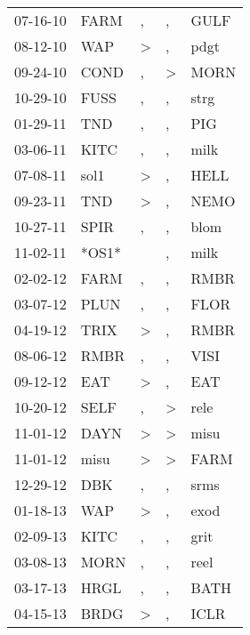 \begin{supertabular}{lllll}
 07-16-10 &   FARM &                , &                , &   GULF \\
 08-12-10 &    WAP &     \textgreater &                , &   pdgt \\
 09-24-10 &   COND &                , &     \textgreater &   MORN \\
 10-29-10 &   FUSS &                , &                , &   strg \\
 01-29-11 &    TND &                , &                , &    PIG \\
 03-06-11 &   KITC &                , &                , &   milk \\
 07-08-11 &   sol1 &     \textgreater &                , &   HELL \\
 09-23-11 &    TND &     \textgreater &                , &   NEMO \\
 10-27-11 &   SPIR &                , &                , &   blom \\
 11-02-11 &  *OS1* &                  &                , &   milk \\
 02-02-12 &   FARM &                , &                , &   RMBR \\
 03-07-12 &   PLUN &                , &                , &   FLOR \\
 04-19-12 &   TRIX &     \textgreater &                , &   RMBR \\
 08-06-12 &   RMBR &                , &                , &   VISI \\
 09-12-12 &    EAT &     \textgreater &                , &    EAT \\
 10-20-12 &   SELF &                , &     \textgreater &   rele \\
 11-01-12 &   DAYN &     \textgreater &     \textgreater &   misu \\
 11-01-12 &   misu &     \textgreater &     \textgreater &   FARM \\
 12-29-12 &    DBK &                , &                , &   srms \\
 01-18-13 &    WAP &     \textgreater &                , &   exod \\
 02-09-13 &   KITC &                , &                , &   grit \\
 03-08-13 &   MORN &                , &                , &   reel \\
 03-17-13 &   HRGL &                , &                , &   BATH \\
 04-15-13 &   BRDG &     \textgreater &                , &   ICLR \\

\end{supertabular}
